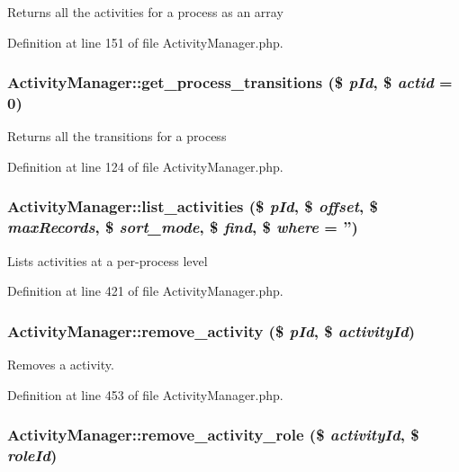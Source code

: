 Returns all the activities for a process as an array 

Definition at line 151 of file Activity\-Manager.php.
\subsubsection{\setlength{\rightskip}{0pt plus 5cm}Activity\-Manager::get\_\-process\_\-transitions (\$ {\em p\-Id}, \$ {\em actid} = 0)}\label{classActivityManager_a9}


Returns all the transitions for a process 

Definition at line 124 of file Activity\-Manager.php.
\subsubsection{\setlength{\rightskip}{0pt plus 5cm}Activity\-Manager::list\_\-activities (\$ {\em p\-Id}, \$ {\em offset}, \$ {\em max\-Records}, \$ {\em sort\_\-mode}, \$ {\em find}, \$ {\em where} = '')}\label{classActivityManager_a17}


Lists activities at a per-process level 

Definition at line 421 of file Activity\-Manager.php.
\subsubsection{\setlength{\rightskip}{0pt plus 5cm}Activity\-Manager::remove\_\-activity (\$ {\em p\-Id}, \$ {\em activity\-Id})}\label{classActivityManager_a18}


Removes a activity. 

Definition at line 453 of file Activity\-Manager.php.
\subsubsection{\setlength{\rightskip}{0pt plus 5cm}Activity\-Manager::remove\_\-activity\_\-role (\$ {\em activity\-Id}, \$ {\em role\-Id})}\label{classActivityManager_a4}



